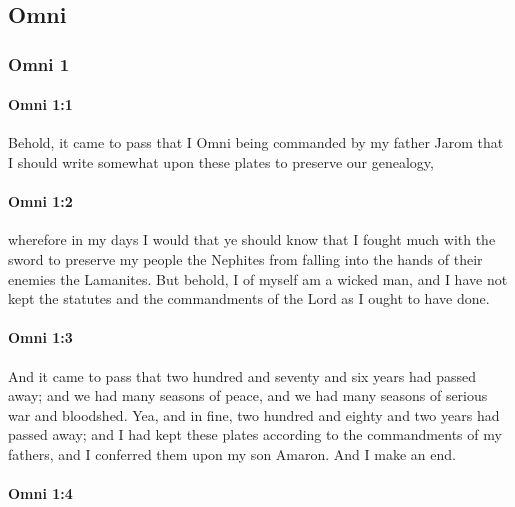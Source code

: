 \subsection{Omni}
	\label{OMNI}

	\subsubsection{Omni 1} %
		\label{OMNI-1}
	
		\paragraph{Omni 1:1} %
			\label{OMNI-1-1}

			Behold, it came to pass that
			I Omni being commanded by my father Jarom
			that I should write somewhat upon these plates to preserve our genealogy,

		\paragraph{Omni 1:2} %
			\label{OMNI-1-2}

			wherefore in my days I would that ye should know
			that I fought much with the sword to preserve my people the Nephites
			from falling into the hands of their enemies the Lamanites.
			But behold, I of myself am a wicked man,
			and I have not kept the statutes and the commandments of the Lord
			as I ought to have done.

		\paragraph{Omni 1:3} %
			\label{OMNI-1-3}

			And it came to pass that two hundred and seventy and six years had passed away;
			and we had many seasons of peace,
			and we had many seasons of serious war and bloodshed.
			Yea, and in fine, two hundred and eighty and two years had passed away;
			and I had kept these plates according to the commandments of my fathers,
			and I conferred them upon my son Amaron.
			And I make an end.

		\paragraph{Omni 1:4} %
			\label{OMNI-1-4}

